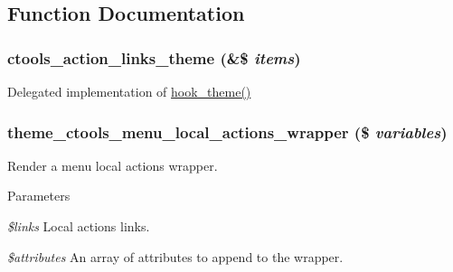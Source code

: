\subsection{Function Documentation}
\hypertarget{action-links_8theme_8inc_a2e3db09f0736b3a266982b5d90e575e1}{
\subsubsection[{ctools\_\-action\_\-links\_\-theme}]{\setlength{\rightskip}{0pt plus 5cm}ctools\_\-action\_\-links\_\-theme (\&\$ {\em items})}}
\label{action-links_8theme_8inc_a2e3db09f0736b3a266982b5d90e575e1}
Delegated implementation of \hyperlink{group__hooks_ga013ccb45c7aaab1c16cf9691428c910d}{hook\_\-theme()} \hypertarget{action-links_8theme_8inc_afe90632f344fea0f367310221e0338d1}{
\subsubsection[{theme\_\-ctools\_\-menu\_\-local\_\-actions\_\-wrapper}]{\setlength{\rightskip}{0pt plus 5cm}theme\_\-ctools\_\-menu\_\-local\_\-actions\_\-wrapper (\$ {\em variables})}}
\label{action-links_8theme_8inc_afe90632f344fea0f367310221e0338d1}
Render a menu local actions wrapper.


\begin{DoxyParams}{Parameters}
\item[{\em \$links}]Local actions links. \item[{\em \$attributes}]An array of attributes to append to the wrapper. \end{DoxyParams}
